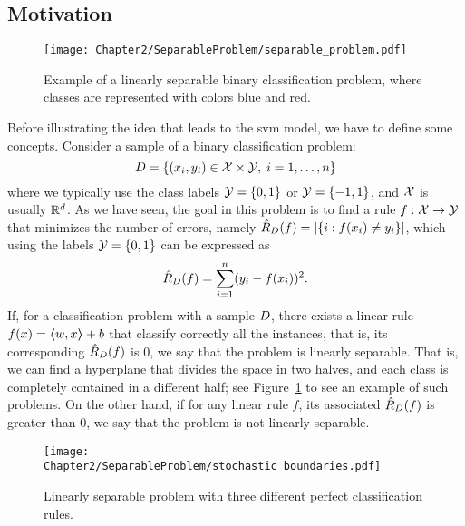 \subsection{Motivation}
%
\begin{figure}[t!]
    \centering
    \texttt{[image: Chapter2/SeparableProblem/separable\_problem.pdf]}
    \caption{Example of a linearly separable binary classification problem, where classes are represented with colors blue and red.}
    \label{fig:separable_problem}
\end{figure}
Before illustrating the idea that leads to the \acrshort{svm} model, we have to define some concepts. Consider a sample of a binary classification problem:
\begin{equation}
    \nonumber
    D = \left\{(x_i, y_i) \in \mathcal{X} \times \mathcal{Y}, \; i=1, \ldots, n\right\}
\end{equation}
where we typically use the class labels $\mathcal{Y} = \left\{0, 1\right\}$ or $\mathcal{Y}=\left\{-1, 1\right\}$, and $\mathcal{X}$ is usually $\mathbb{R}^d$. As we have seen, the goal in this problem is to find a rule $f: \mathcal{X} \to \mathcal{Y}$ that minimizes the number of errors, namely $\hat{R}_{D}(f) = \left|\left\{i: f(x_i) \neq y_i\right\}\right|$, which using the labels $\mathcal{Y} = \left\{0, 1\right\}$ can be expressed as
\begin{equation}
    \nonumber
    \hat{R}_{D}(f) = \sum_{i=1}^n (y_i - f(x_i))^2 .
\end{equation}
If, for a classification problem with a sample $D$, there exists a linear rule $f(x) = \bm{\left\langle} w, x \bm{\right\rangle} + b$ that classify correctly all the instances, that is, its corresponding $\hat{R}_{D}(f)$ is $0$, we say that the problem is linearly separable. That is, we can find a hyperplane that divides the space in two halves, and each class is completely contained in a different half; see Figure~\ref{fig:separable_problem} to see an example of such problems.
On the other hand, if for any linear rule $f$, its associated $\hat{R}_{D}(f)$ is greater than $0$, we say that the problem is not linearly separable. 
%
\begin{figure}[t!]
    \centering
    \texttt{[image: Chapter2/SeparableProblem/stochastic\_boundaries.pdf]}
    \caption{Linearly separable problem with three different perfect classification rules.}
    \label{fig:stochastic_boundaries}
\end{figure}

